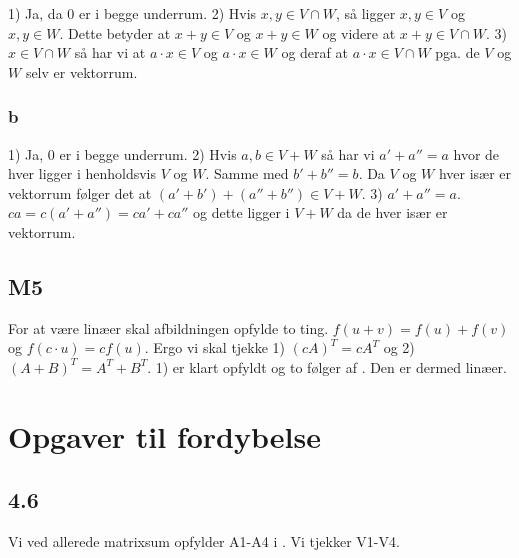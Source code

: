 				1) Ja, da $0$ er i begge underrum. 2) Hvis $x,y\in V \cap W$, så ligger $x,y\in V$ og $x,y\in W$. Dette betyder at $x+y\in V$ og $x+y\in W$ og videre at $x+y\in V\cap W$. 3) $x\in V \cap W$ så har vi at $a\cdot x\in V$ og $a\cdot x\in W$ og deraf at $a\cdot x\in V \cap W$ pga. de $V$ og $W$ selv er vektorrum.

			\subsubsection{b}

				1) Ja, $0$ er i begge underrum. 2) Hvis $a,b\in V + W$ så har vi $a'+a''=a$ hvor de hver ligger i henholdsvis $V$ og $W$. Samme med $b'+b''=b$. Da $V$ og $W$ hver især er vektorrum følger det at $(a'+b')+(a''+b'')\in V+W$. 3) $a'+a''=a$. $ca=c(a'+a'')=ca'+ca''$ og dette ligger i $V+W$ da de hver især er vektorrum.

		\subsection{M5}

			For at være linæer skal afbildningen opfylde to ting. $f(u+v)=f(u)+f(v)$ og $f(c\cdot u)=cf(u)$. Ergo vi skal tjekke 1) $(cA)^T=cA^T$ og 2) $(A+B)^T=A^T+B^T$. 1) er klart opfyldt og to følger af \cite[Sætning 2.6.7]{hesselholt2017}. Den er dermed linæer.

	\section{Opgaver til fordybelse}

		\subsection{4.6}

			Vi ved allerede matrixsum opfylder A1-A4 i \cite[Definition 4.1.1]{hesselholt2017}. Vi tjekker V1-V4.
